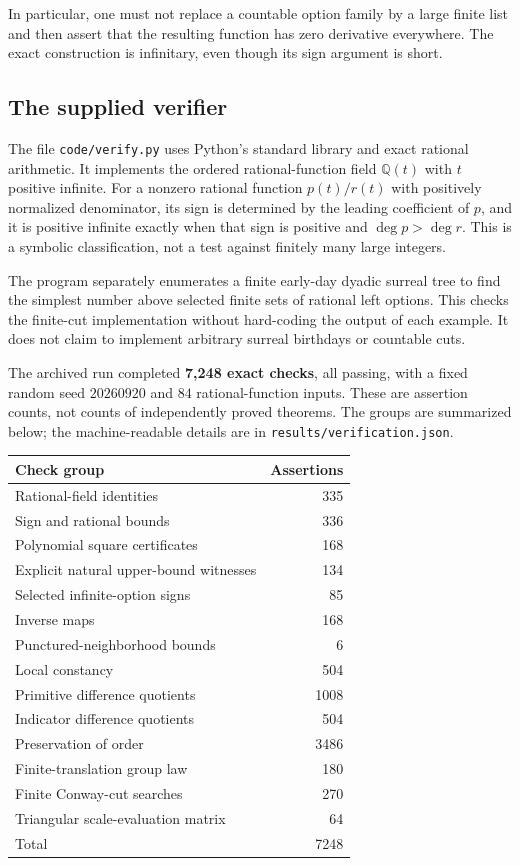 \documentclass[11pt,letterpaper]{article}
\numberwithin{equation}{section}
\theoremstyle{definition}
\theoremstyle{remark}
\newcommand{\Q}{\mathbb{Q}}
\begin{document}
In particular, one must not replace a countable option family by a large
finite list and then assert that the resulting function has zero
derivative everywhere. The exact construction is infinitary, even though
its sign argument is short.

\subsection{The supplied verifier}
The file \texttt{code/verify.py} uses Python's standard library and exact
rational arithmetic. It implements the ordered rational-function field
$\Q(t)$ with $t$ positive infinite. For a nonzero rational function
$p(t)/r(t)$ with positively normalized denominator, its sign is determined
by the leading coefficient of $p$, and it is positive infinite exactly
when that sign is positive and $\deg p>\deg r$. This is a symbolic
classification, not a test against finitely many large integers.

The program separately enumerates a finite early-day dyadic surreal tree
to find the simplest number above selected finite sets of rational left
options. This checks the finite-cut implementation without hard-coding
the output of each example. It does not claim to implement arbitrary
surreal birthdays or countable cuts.

The archived run completed \textbf{7,248 exact checks}, all passing,
with a fixed random seed $20260920$ and $84$ rational-function inputs.
These are assertion counts, not counts of independently proved theorems.
The groups are summarized below; the machine-readable details are in
\texttt{results/verification.json}.

\begin{center}
\small
\begin{tabular}{lr}
\toprule
Check group & Assertions\\
\midrule
Rational-field identities &335\\
Sign and rational bounds &336\\
Polynomial square certificates &168\\
Explicit natural upper-bound witnesses &134\\
Selected infinite-option signs &85\\
Inverse maps &168\\
Punctured-neighborhood bounds &6\\
Local constancy &504\\
Primitive difference quotients &1008\\
Indicator difference quotients &504\\
Preservation of order &3486\\
Finite-translation group law &180\\
Finite Conway-cut searches &270\\
Triangular scale-evaluation matrix &64\\
\midrule
Total &7248\\
\bottomrule
\end{tabular}
\end{center}
\end{document}
